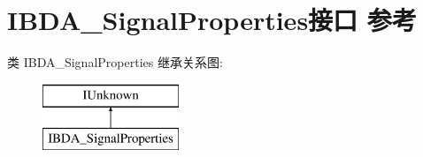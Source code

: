 \hypertarget{interface_i_b_d_a___signal_properties}{}\section{I\+B\+D\+A\+\_\+\+Signal\+Properties接口 参考}
\label{interface_i_b_d_a___signal_properties}
类 I\+B\+D\+A\+\_\+\+Signal\+Properties 继承关系图\+:\begin{figure}[H]
\begin{center}
\leavevmode
\includegraphics[height=2.000000cm]{interface_i_b_d_a___signal_properties}
\end{center}
\end{figure}

